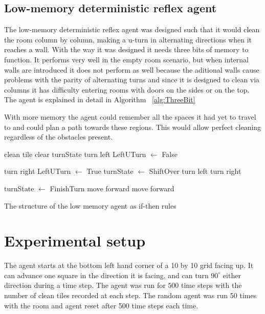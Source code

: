 \documentclass{article}
\begin{document}
\subsection{Low-memory deterministic reflex agent}
The low-memory deterministic reflex agent was designed such that it would clean the room column by column, making a u-turn in alternating directions when it reaches a wall. With the way it was designed it needs three bits of memory to function. It performs very well in the empty room scenario, but when internal walls are introduced it does not perform as well because the aditional walls cause problems with the parity of alternating turns and since it is designed to clean via columns it has difficulty entering rooms with doors on the sides or on the top. The agent is explained in detail in Algorithm ~\ref{alg:ThreeBit}

With more memory the agent could remember all the spaces it had yet to travel to and could plan a path towards these regions. This would allow perfect cleaning regardless of the obstacles present.
\begin{algorithm}
  \begin{algorithmic}[1]
        \State clean tile
      \Else 
          \State clear turnState
            \State turn left
            \State LeftUTurn $\gets$ False
            
          \Else
            \State turn right
            \State LeftUTurn $\gets$ True
          \EndIf
        \EndIf
          \State turnState $\gets$ ShiftOver
            \State turn left
          \Else
            \State turn right
          \EndIf
          
        \Else
            \State turnState $\gets$ FinishTurn
            \State move forward
          \Else
            \State move forward
          \EndIf
        \EndIf
      \EndIf
    \EndFor
  \end{algorithmic}\caption{The structure of the low memory agent as if-then rules}
  \label{alg:ThreeBit}
\end{algorithm}
\section{Experimental setup}
The agent starts at the bottom left hand corner of a 10 by 10 grid facing up. It can advance one square in the direction it is facing, and can turn $90^\circ$ either direction during a time step. The agent was run for 500 time steps with the number of clean tiles recorded at each step. The random agent was run 50 times with the room and agent reset after 500 time steps each time.
\end{document}
